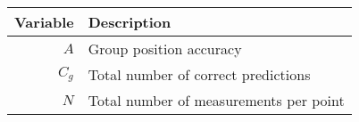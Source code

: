 \begin{tabular}{r|l}
Variable & Description \\ \hline
$A$ & Group position accuracy \\ 
$C_g$ & Total number of correct predictions \\ 
$N$ & Total number of measurements per point \\ 
\end{tabular}
